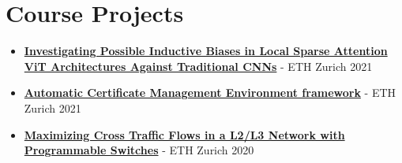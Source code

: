 \section{Course Projects}

\begin{itemize}

\item \textbf{ {\href{https://github.com/Siddhant-Ray/Deep-Learning-Project-2021}{Investigating Possible Inductive Biases in Local Sparse Attention ViT Architectures Against Traditional CNNs}}} - ETH Zurich 2021 
\item \textbf{ {\href{https://github.com/Siddhant-Ray/NetworkSecurity-ACME-Project}{Automatic Certificate Management Environment framework}}} - ETH Zurich 2021  
\item  \textbf{ {\href{https://github.com/Siddhant-Ray/Advnet-Project-ETH}{Maximizing Cross Traffic Flows in a L2/L3 Network with Programmable Switches}}} - ETH Zurich 2020 
\end{itemize}